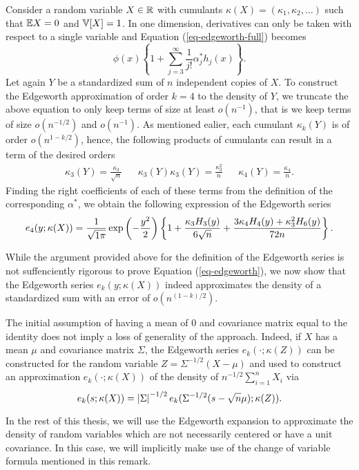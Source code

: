 \begin{example} \label{ex-edgeworth-1d}
    Consider a random variable $X \in \mathbb{R}$ with cumulants $\kappa(X) = (\kappa_1, \kappa_2, \ldots)$ such that $\mathbb{E}{X} = 0$ and $\mathbb{V}[X] = 1$. In one dimension, derivatives can only be taken with respect to a single variable and Equation (\ref{eq-edgeworth-full}) becomes
    \begin{equation*}
        \phi(x) \left\{
            1 + \sum_{j=3}^\infty  \frac{1}{j!}\alpha^*_j h_j(x)
        \right\}.
    \end{equation*}
    Let again $Y$ be a standardized sum of $n$ independent copies of $X$. To construct the Edgeworth approximation of order $k = 4$ to the density of $Y$, we truncate the above equation to only keep terms of size at least $o(n^{-1})$, that is we keep terms of size $o(n^{-1/2})$ and $o(n^{-1})$. As mentioned ealier, each cumulant $\kappa_k(Y)$ is of order $o(n^{1-k/2})$, hence, the following products of cumulants can result in a term of the desired orders
    \begin{align*}
        \kappa_3(Y) = \frac{\kappa_3}{\sqrt{n}} && \kappa_3(Y)\kappa_3(Y) = \frac{\kappa_3^2}{n} && \kappa_4(Y) = \frac{\kappa_4}{n}.
    \end{align*}
    Finding the right coefficients of each of these terms from the definition of the corresponding $\alpha^*$, we obtain the following expression of the Edgeworth series
    \begin{equation} \label{eq-edgeworth-1d-4}
        e_4(y; \kappa(X)) = \frac{1}{\sqrt{1\pi}}\exp\left(-\frac{y^2}{2}\right)\left\{1 + \frac{\kappa_3 H_3(y)}{6\sqrt{n}} + \frac{3\kappa_4 H_4(y) + \kappa_3^2 H_6(y)}{72 n}\right\}.
    \end{equation}
\end{example}

While the argument provided above for the definition of the Edgeworth series is not suffenciently rigorous to prove Equation (\ref{eq-edgeworth}), we now show that the Edgeworth series $e_k(y; \kappa(X))$ indeed approximates the density of a standardized sum with an error of $o(n^{(1-k)/2})$.

\begin{remark} \label{rem-centering}
    The initial assumption of having a mean of 0 and covariance matrix equal to the identity does not imply a loss of generality of the approach. Indeed, if $X$ has a mean $\mu$ and covariance matrix $\Sigma$, the Edgeworth series $e_k(\cdot; \kappa(Z))$ can be constructed for the random variable $Z = \Sigma^{-1/2}(X - \mu)$ and used to construct an approximation $e_k(\cdot; \kappa(X))$ of the density of $n^{-1/2} \sum_{i=1}^n X_i$ via
    \begin{equation*}
        e_k(s; \kappa(X)) = \left|\Sigma\right|^{-1/2} e_k(\Sigma^{-1/2}(s - \sqrt{n}\mu); \kappa(Z)).
    \end{equation*}

    In the rest of this thesis, we will use the Edgeworth expansion to approximate the density of random variables which are not necessarily centered or have a unit covariance. In this case, we will implicitly make use of the change of variable formula mentioned in this remark. 
\end{remark}


